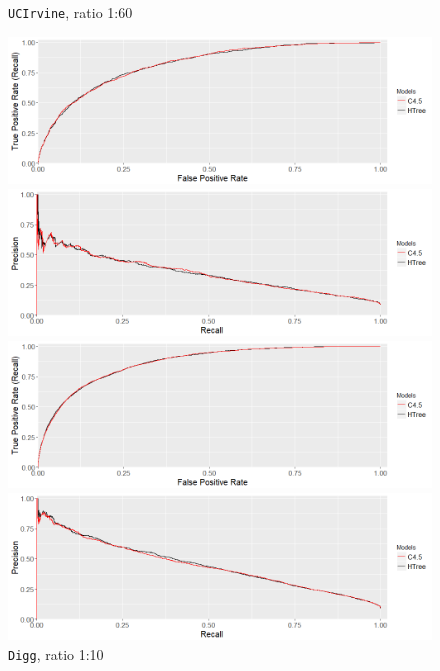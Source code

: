 \documentclass{acm_proc_article-sp}
\begin{document}
\begin{figure}
\begin{multicols}{2}
	\end{multicols}
	\caption{\texttt{UCIrvine}, ratio 1:60}
	\label{UCIrvine60}
	\begin{multicols}{2}
		\includegraphics[width=\linewidth]{DiggNetwork_ROC}\par
		\includegraphics[width=\linewidth]{DiggNetwork_PR}\par
	\end{multicols}
	\caption{\texttt{Digg}, ratio 1:10}
	\label{Digg}
	\begin{multicols}{2}
		\includegraphics[width=\linewidth]{MathOverflow_ROC}\par
		\includegraphics[width=\linewidth]{MathOverflow_PR}\par

\end{multicols}
\end{figure}
\end{document}
